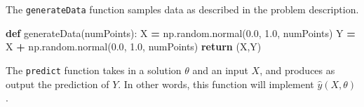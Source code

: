 \documentclass[12pt, twoside]{amherstthesis}
\newenvironment{Shaded}{\begin{snugshade}}{\end{snugshade}}
\newcommand{\ControlFlowTok}[1]{\textcolor[rgb]{0.13,0.29,0.53}{\textbf{#1}}}
\newcommand{\FloatTok}[1]{\textcolor[rgb]{0.00,0.00,0.81}{#1}}
\newcommand{\KeywordTok}[1]{\textcolor[rgb]{0.13,0.29,0.53}{\textbf{#1}}}
\newcommand{\NormalTok}[1]{#1}
\newcommand{\OperatorTok}[1]{\textcolor[rgb]{0.81,0.36,0.00}{\textbf{#1}}}
\begin{document}
\noindent The \texttt{generateData} function samples data as described in the problem description.
\begin{Shaded}
\begin{Highlighting}[]
\KeywordTok{def}\NormalTok{ generateData(numPoints):}
\NormalTok{    X }\OperatorTok{=}\NormalTok{     np.random.normal(}\FloatTok{0.0}\NormalTok{, }\FloatTok{1.0}\NormalTok{, numPoints) }
\NormalTok{    Y }\OperatorTok{=}\NormalTok{ X }\OperatorTok{+}\NormalTok{ np.random.normal(}\FloatTok{0.0}\NormalTok{, }\FloatTok{1.0}\NormalTok{, numPoints) }
    \ControlFlowTok{return}\NormalTok{ (X,Y)}
\end{Highlighting}
\end{Shaded}
\noindent The \texttt{predict} function takes in a solution \(\theta\) and an input \(X\), and produces as output the prediction of \(Y\). In other words, this function will implement \(\hat{y}(X, \theta)\).
\end{document}
